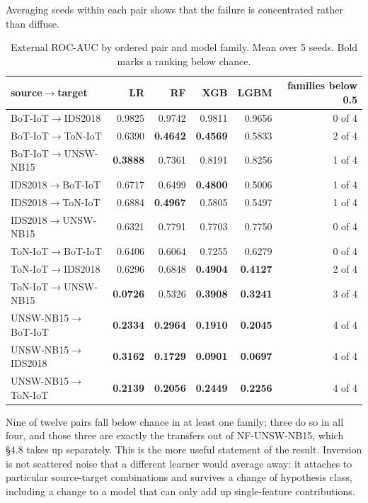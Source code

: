 \documentclass[journal]{IEEEtran}
\begin{document}
Averaging seeds within each pair shows that the failure is concentrated rather than diffuse.

\begin{table}[htbp]\centering\scriptsize
\caption{External ROC-AUC by ordered pair and model family. Mean over 5 seeds. Bold marks a ranking below chance.}
\begin{tabular}{lrrrrr}
\toprule
source$\rightarrow$target & LR & RF & XGB & LGBM & families below 0.5 \\
\midrule
BoT-IoT$\rightarrow$IDS2018 & 0.9825 & 0.9742 & 0.9811 & 0.9656 & 0 of 4 \\
BoT-IoT$\rightarrow$ToN-IoT & 0.6390 & \textbf{0.4642} & \textbf{0.4569} & 0.5833 & 2 of 4 \\
BoT-IoT$\rightarrow$UNSW-NB15 & \textbf{0.3888} & 0.7361 & 0.8191 & 0.8256 & 1 of 4 \\
IDS2018$\rightarrow$BoT-IoT & 0.6717 & 0.6499 & \textbf{0.4800} & 0.5006 & 1 of 4 \\
IDS2018$\rightarrow$ToN-IoT & 0.6884 & \textbf{0.4967} & 0.5805 & 0.5497 & 1 of 4 \\
IDS2018$\rightarrow$UNSW-NB15 & 0.6321 & 0.7791 & 0.7703 & 0.7750 & 0 of 4 \\
ToN-IoT$\rightarrow$BoT-IoT & 0.6406 & 0.6064 & 0.7255 & 0.6279 & 0 of 4 \\
ToN-IoT$\rightarrow$IDS2018 & 0.6296 & 0.6848 & \textbf{0.4904} & \textbf{0.4127} & 2 of 4 \\
ToN-IoT$\rightarrow$UNSW-NB15 & \textbf{0.0726} & 0.5326 & \textbf{0.3908} & \textbf{0.3241} & 3 of 4 \\
UNSW-NB15$\rightarrow$BoT-IoT & \textbf{0.2334} & \textbf{0.2964} & \textbf{0.1910} & \textbf{0.2045} & 4 of 4 \\
UNSW-NB15$\rightarrow$IDS2018 & \textbf{0.3162} & \textbf{0.1729} & \textbf{0.0901} & \textbf{0.0697} & 4 of 4 \\
UNSW-NB15$\rightarrow$ToN-IoT & \textbf{0.2139} & \textbf{0.2056} & \textbf{0.2449} & \textbf{0.2256} & 4 of 4 \\
\bottomrule
\end{tabular}
\end{table}

Nine of twelve pairs fall below chance in at least one family; three do so in all four, and those three are exactly the transfers out of NF-UNSW-NB15, which §4.8 takes up separately. This is the more useful statement of the result. Inversion is not scattered noise that a different learner would average away: it attaches to particular source-target combinations and survives a change of hypothesis class, including a change to a model that can only add up single-feature contributions.
\end{document}
